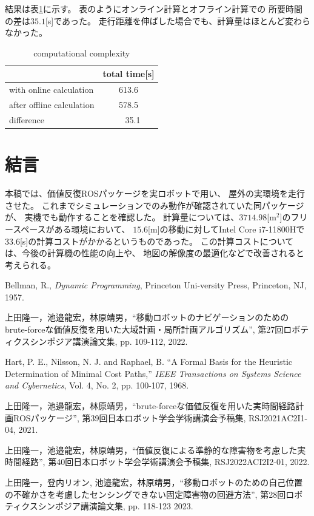\documentclass{jarticle}
\begin{document}
結果は表\ref{table:result2}に示す。
表のようにオンライン計算とオフライン計算での
所要時間の差は$35.1$[s]であった。
走行距離を伸ばした場合でも、計算量はほとんど変わらなかった。

\begin{table}[hbtp]
	\caption{computational complexity}
	\label{table:result2}
	\centering
	\begin{small}
	 \begin{tabular}{l|c}
		\hline
		 & total time[s] \\
		\hline \hline
		with online calculation & 613.6 \\
		after offline calculation & 578.5 \\
		\hline
		 difference & \ \ 35.1 \\
		\hline
	 \end{tabular}
	\end{small}
\end{table}

\section{結言}%

本稿では、価値反復ROSパッケージを実ロボットで用い、
屋外の実環境を走行させた。
これまでシミュレーションでのみ動作が確認されていた同パッケージが、
実機でも動作することを確認した。
計算量については、$3714.98$[m$^2$]のフリースペースがある環境において、
$15.6$[m]の移動に対してIntel Core i7-11800Hで
$33.6$[s]の計算コストがかかるというものであった。
この計算コストについては、今後の計算機の性能の向上や、
地図の解像度の最適化などで改善されると考えられる。

\footnotesize
\begin{thebibliography}{99}

	Bellman, R., {\it Dynamic Programming}, Princeton Uni-versity Press, Princeton, NJ, 1957.

	上田隆一，池邉龍宏，林原靖男，``移動ロボットのナビゲーションのためのbrute-forceな価値反復を用いた大域計画・局所計画アルゴリズム'', 
	第27回ロボティクスシンポジア講演論文集, pp. 109-112, 2022.
	
	Hart, P. E., Nilsson, N. J. and Raphael, B. ``A Formal
	Basis for the Heuristic Determination of Minimal Cost
	Paths,'' {\it IEEE Transactions on Systems Science and Cybernetics}, Vol. 4, No. 2, pp. 100-107, 1968.
	
	上田隆一，池邉龍宏，林原靖男，``brute-forceな価値反復を用いた実時間経路計画ROSパッケージ'', 
	第39回日本ロボット学会学術講演会予稿集, RSJ2021AC2I1-04, 2021.

	上田隆一，池邉龍宏，林原靖男，``価値反復による準静的な障害物を考慮した実時間経路'', 
	第40回日本ロボット学会学術講演会予稿集, RSJ2022ACI2I2-01, 2022.

	上田隆一，登内リオン, 池邉龍宏，林原靖男，``移動ロボットのための自己位置の不確かさを考慮したセンシングできない固定障害物の回避方法'', 
	第28回ロボティクスシンポジア講演論文集, pp. 118-123 2023.

\end{thebibliography}

\normalsize
\end{document}
